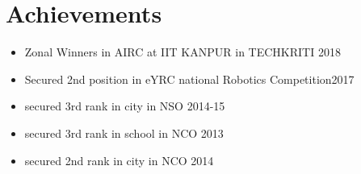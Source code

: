 \documentclass[8pt]{article}
\begin{document}
\section{Achievements}
\begin{itemize}
\item Zonal Winners in AIRC at IIT KANPUR in TECHKRITI 2018
\item Secured 2nd position in eYRC national Robotics Competition2017
\item secured 3rd rank in city in NSO 2014-15
\item secured 3rd rank in school in NCO 2013
\item secured 2nd rank in city in NCO  2014
\end{itemize}
\end{document}
